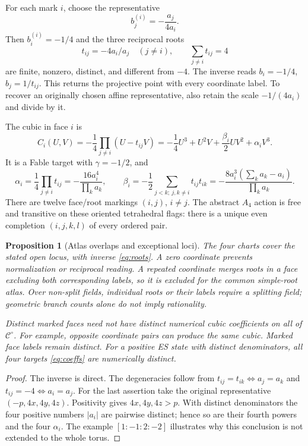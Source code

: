 \documentclass[11pt]{article}
\newtheorem{proposition}[theorem]{Proposition}
\theoremstyle{remark}\newtheorem{remark}[theorem]{Remark}
\begin{document}
For each mark $i$, choose the representative
\[
 b_j^{(i)}=-\frac{a_j}{4a_i}.
\]
Then $b_i^{(i)}=-1/4$ and the three reciprocal roots
\begin{equation}\label{eq:roots}
 t_{ij}=-4a_i/a_j\quad(j\ne i),\qquad\sum_{j\ne i}t_{ij}=4
\end{equation}
are finite, nonzero, distinct, and different from $-4$. The inverse reads $b_i=-1/4$, $b_j=1/t_{ij}$. This returns the projective point with every coordinate label. To recover an originally chosen affine representative, also retain the scale $-1/(4a_i)$ and divide by it.

The cubic in face $i$ is
\[
 C_i(U,V)=-\frac14\prod_{j\ne i}(U-t_{ij}V)
 =-\frac14U^3+U^2V+\frac{\beta_i}{2}UV^2+\alpha_iV^3.
\]
It is a Fable target with $\gamma=-1/2$, and
\begin{equation}\label{eq:coeffs}
 \alpha_i=\frac14\prod_{j\ne i}t_{ij}
 =-\frac{16a_i^4}{\prod_k a_k},\qquad
 \beta_i=-\frac12\sum_{j<k;\ j,k\ne i}t_{ij}t_{ik}
 =-\frac{8a_i^3(\sum_k a_k-a_i)}{\prod_k a_k}.
\end{equation}
There are twelve face/root markings $(i,j)$, $i\ne j$. The abstract $A_4$ action is free and transitive on these oriented tetrahedral flags: there is a unique even completion $(i,j,k,l)$ of every ordered pair.

\begin{proposition}[Atlas overlaps and exceptional loci]
The four charts cover the stated open locus, with inverse \eqref{eq:roots}. A zero coordinate prevents normalization or reciprocal reading. A repeated coordinate merges roots in a face excluding both corresponding labels, so it is excluded for the common simple-root atlas. Over non-split fields, individual roots or their labels require a splitting field; geometric branch counts alone do not imply rationality.

Distinct marked faces need not have distinct numerical cubic coefficients on all of $\mathcal C^\circ$. For example, opposite coordinate pairs can produce the same cubic. Marked face labels remain distinct. For a positive ES state with distinct denominators, all four targets \eqref{eq:coeffs} are numerically distinct.
\end{proposition}
\begin{proof}
The inverse is direct. The degeneracies follow from $t_{ij}=t_{ik}\iff a_j=a_k$ and $t_{ij}=-4\iff a_i=a_j$. For the last assertion take the original representative $(-p,4x,4y,4z)$. Positivity gives $4x,4y,4z>p$. With distinct denominators the four positive numbers $|a_i|$ are pairwise distinct; hence so are their fourth powers and the four $\alpha_i$. The example $[1:-1:2:-2]$ illustrates why this conclusion is not extended to the whole torus.
\end{proof}
\end{document}
